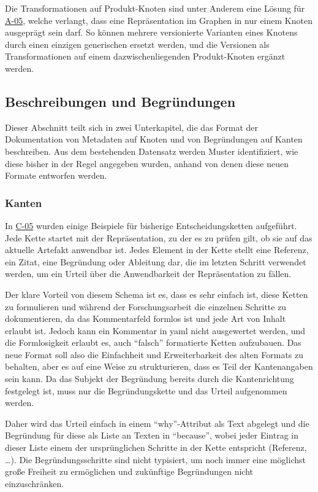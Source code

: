 Die Transformationen auf Produkt-Knoten sind unter Anderem eine Lösung für \hyperref[subsec:req-unique-product-representations]{A-05}, welche verlangt, dass eine Repräsentation im Graphen in nur einem Knoten ausgeprägt sein darf.
So können mehrere versionierte Varianten eines Knotens durch einen einzigen generischen ersetzt werden, und die Versionen als Transformationen auf einem dazwischenliegenden Produkt-Knoten ergänzt werden.

\subsection{Beschreibungen und Begründungen}\label{subsec:model-rationale}

Dieser Abschnitt teilt sich in zwei Unterkapitel, die das Format der Dokumentation von Metadaten auf Knoten und von Begründungen auf Kanten beschreiben.
Aus dem bestehenden Datensatz werden Muster identifiziert, wie diese bisher in der Regel angegeben wurden, anhand von denen diese neuen Formate entworfen werden.

\subsubsection{Kanten}

In \hyperref[subsec:c-05-reason-not-good-enough]{C-05} wurden einige Beispiele für bisherige Entscheidungsketten aufgeführt.
Jede Kette startet mit der Repräsentation, zu der es zu prüfen gilt, ob sie auf das aktuelle Artefakt anwendbar ist.
Jedes Element in der Kette stellt eine Referenz, ein Zitat, eine Begründung oder Ableitung dar, die im letzten Schritt verwendet werden, um ein Urteil über die Anwendbarkeit der Repräsentation zu fällen.

Der klare Vorteil von diesem Schema ist es, dass es sehr einfach ist, diese Ketten zu formulieren und während der Forschungsarbeit die einzelnen Schritte zu dokumentieren, da das Kommentarfeld formlos ist und jede Art von Inhalt erlaubt ist.
Jedoch kann ein Kommentar in \acrshort{yaml} nicht ausgewertet werden, und die Formlosigkeit erlaubt es, auch \enquote{falsch} formatierte Ketten aufzubauen.
Das neue Format soll also die Einfachheit und Erweiterbarkeit des alten Formats zu behalten, aber es auf eine Weise zu strukturieren, dass es Teil der Kantenangaben sein kann.
Da das Subjekt der Begründung bereits durch die Kantenrichtung festgelegt ist, muss nur die Begründungskette und das Urteil aufgenommen werden.

Daher wird das Urteil einfach in einem \enquote{why}-Attribut als Text abgelegt und die Begründung für diese als Liste an Texten in \enquote{because}, wobei jeder Eintrag in dieser Liste einem der ursprünglichen Schritte in der Kette entspricht (Referenz, \ldots).
Die Begründungsschritte sind nicht typisiert, um noch immer eine möglichst große Freiheit zu ermöglichen und zukünftige Begründungen nicht einzuschränken.

